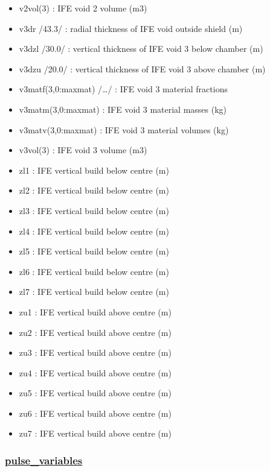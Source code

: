 \documentclass[]{article}
\begin{document}
\begin{itemize}
\item
  v2vol(3) : IFE void 2 volume (m3)
\item
  v3dr /43.3/ : radial thickness of IFE void outside shield (m)
\item
  v3dzl /30.0/ : vertical thickness of IFE void 3 below chamber (m)
\item
  v3dzu /20.0/ : vertical thickness of IFE void 3 above chamber (m)
\item
  v3matf(3,0:maxmat) /\ldots{}/ : IFE void 3 material fractions
\item
  v3matm(3,0:maxmat) : IFE void 3 material masses (kg)
\item
  v3matv(3,0:maxmat) : IFE void 3 material volumes (kg)
\item
  v3vol(3) : IFE void 3 volume (m3)
\item
  zl1 : IFE vertical build below centre (m)
\item
  zl2 : IFE vertical build below centre (m)
\item
  zl3 : IFE vertical build below centre (m)
\item
  zl4 : IFE vertical build below centre (m)
\item
  zl5 : IFE vertical build below centre (m)
\item
  zl6 : IFE vertical build below centre (m)
\item
  zl7 : IFE vertical build below centre (m)
\item
  zu1 : IFE vertical build above centre (m)
\item
  zu2 : IFE vertical build above centre (m)
\item
  zu3 : IFE vertical build above centre (m)
\item
  zu4 : IFE vertical build above centre (m)
\item
  zu5 : IFE vertical build above centre (m)
\item
  zu6 : IFE vertical build above centre (m)
\item
  zu7 : IFE vertical build above centre (m)
\end{itemize}

\subsubsection{\texorpdfstring{\href{pulse_variables.html}{pulse\_variables}}{pulse\_variables}}\label{pulse_variables}
\end{document}
